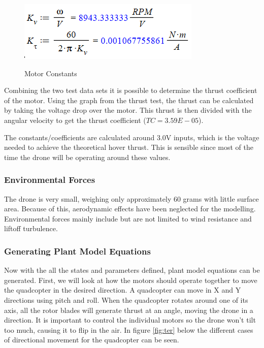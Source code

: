\begin{figure}[H]
\begin{center}
   \includegraphics[scale =1.5]{pictures/control/Motor constants calc.png}
   \label{motorconstantscals}
\end{center}
\caption{Motor Constants}
\end{figure}

Combining the two test data sets it is possible to determine the thrust coefficient of the motor. Using the graph from the thrust test, the thrust can be calculated by taking the voltage drop over the motor. This thrust is then divided with the angular velocity to get the thrust coefficient ($TC=3.59E-05$).

The constants/coefficients are calculated around 3.0V inputs, which is the voltage needed to achieve the theoretical hover thrust. This is sensible since most of the time the drone will be operating around these values. 

\subsubsection{Environmental Forces}
The drone is very small, weighing only approximately 60 grams with little surface area. Because of this, aerodynamic effects have been neglected for the modelling. Environmental forces mainly include but are not limited to wind resistance and liftoff turbulence.

\subsubsection{Generating Plant Model Equations}
Now with the all the states and parameters defined, plant model equations can be generated. 
First, we will look at how the motors should operate together to move the quadcopter in the desired direction. A quadcopter can move in X and Y directions using pitch and roll. When the quadcopter rotates around one of its axis, all the rotor blades will generate thrust at an angle, moving the drone in a direction. It is important to control the individual motors so the drone won’t tilt too much, causing it to flip in the air. In figure \ref{fig:ter} below the different cases of directional movement for the quadcopter can be seen.  



